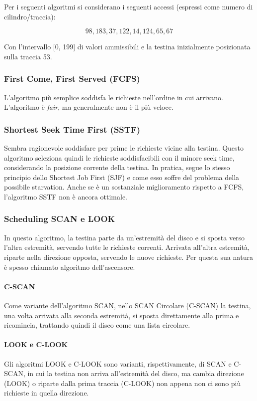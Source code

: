 \documentclass[a4]{article}
\begin{document}
Per i seguenti algoritmi si considerano i seguenti accessi (espressi come numero di cilindro/traccia):

$$98, 183, 37, 122, 14, 124, 65, 67$$

Con l'intervallo [0, 199] di valori ammissibili e la testina inizialmente posizionata sulla traccia 53.

\subsubsection{First Come, First Served (FCFS)}
L'algoritmo più semplice soddisfa le richieste nell'ordine in cui arrivano. L'algoritmo è \textit{fair}, ma generalmente non è il più veloce.

\subsubsection{Shortest Seek Time First (SSTF)}
Sembra ragionevole soddisfare per prime le richieste vicine alla testina. Questo algoritmo seleziona quindi le richieste soddisfacibili con il minore seek time, considerando la posizione corrente della testina. In pratica, segue lo stesso principio dello Shortest Job First (SJF) e come esso soffre del problema della possibile starvation. Anche se è un sostanziale miglioramento rispetto a FCFS, l'algoritmo SSTF non è ancora ottimale.

\subsubsection{Scheduling SCAN e LOOK}
In questo algoritmo, la testina parte da un'estremità del disco e si sposta verso l'altra estremità, servendo tutte le richieste correnti. Arrivata all'altra estremità, riparte nella direzione opposta, servendo le nuove richieste. Per questa sua natura è spesso chiamato algoritmo dell'ascensore.

\paragraph{C-SCAN} Come variante dell'algoritmo SCAN, nello SCAN Circolare (C-SCAN) la testina, una volta arrivata alla seconda estremità, si sposta direttamente alla prima e ricomincia, trattando quindi il disco come una lista circolare.

\paragraph{LOOK e C-LOOK} Gli algoritmi LOOK e C-LOOK sono varianti, rispettivamente, di SCAN e C-SCAN, in cui la testina non arriva all'estremità del disco, ma cambia direzione (LOOK) o riparte dalla prima traccia (C-LOOK) non appena non ci sono più richieste in quella direzione.
\end{document}

